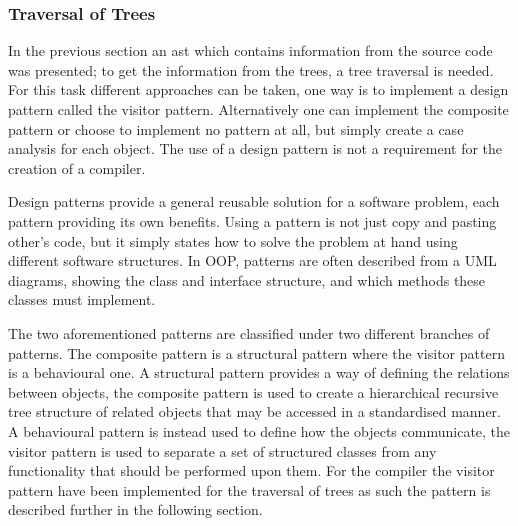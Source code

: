 \subsubsection*{Traversal of Trees}
In the previous section an \acrshort{ast} which contains information from the source code was presented; to get the information from the trees, a tree traversal is needed.
For this task different approaches can be taken, one way is to implement a design pattern called the visitor pattern.
Alternatively one can implement the composite pattern or choose to implement no pattern at all, but simply create a case analysis for each object.
The use of a design pattern is not a requirement for the creation of a compiler.

Design patterns provide a general reusable solution for a software problem, each pattern providing its own benefits.
Using a pattern is not just copy and pasting other's code, but it simply states how to solve the problem at hand using different software structures.
In OOP, patterns are often described from a UML diagrams, showing the class and interface structure, and which methods these classes must implement. 

The two aforementioned patterns are classified under two different branches of patterns.
The composite pattern is a structural pattern where the visitor pattern is a behavioural one.
A structural pattern provides a way of defining the relations between objects, the composite pattern is used to create a hierarchical recursive tree structure of related objects that may be accessed in a standardised manner.
A behavioural pattern is instead used to define how the objects communicate, the visitor pattern is used to separate a set of structured classes from any functionality that should be performed upon them. \citep{GOF}
For the compiler the visitor pattern have been implemented for the traversal of trees as such the pattern is described further in the following section. 
